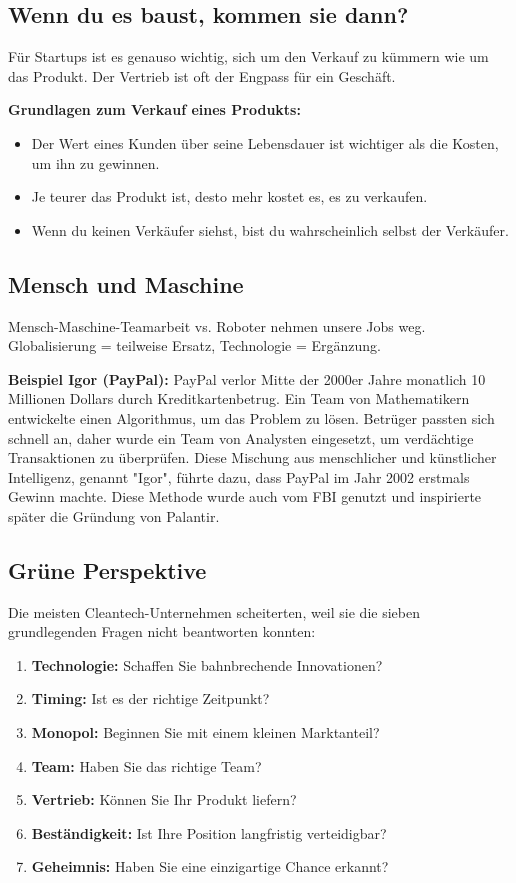 \documentclass[10pt]{article}
\begin{document}
\subsection{Wenn du es baust, kommen sie dann?}

Für Startups ist es genauso wichtig, sich um den Verkauf zu kümmern wie um das Produkt. Der Vertrieb ist oft der Engpass für ein Geschäft.

\textbf{Grundlagen zum Verkauf eines Produkts:}

\begin{itemize}
\item Der Wert eines Kunden über seine Lebensdauer ist wichtiger als die Kosten, um ihn zu gewinnen.
\item Je teurer das Produkt ist, desto mehr kostet es, es zu verkaufen.
\item Wenn du keinen Verkäufer siehst, bist du wahrscheinlich selbst der Verkäufer.
\end{itemize}

\subsection{Mensch und Maschine}

Mensch-Maschine-Teamarbeit vs. Roboter nehmen unsere Jobs weg.
Globalisierung = teilweise Ersatz, Technologie = Ergänzung.

\textbf{Beispiel Igor (PayPal):}
PayPal verlor Mitte der 2000er Jahre monatlich 10 Millionen Dollars durch Kreditkartenbetrug.
Ein Team von Mathematikern entwickelte einen Algorithmus, um das Problem zu lösen.
Betrüger passten sich schnell an, daher wurde ein Team von Analysten eingesetzt, um verdächtige Transaktionen zu überprüfen.
Diese Mischung aus menschlicher und künstlicher Intelligenz, genannt "Igor", führte dazu, dass PayPal im Jahr 2002 erstmals Gewinn machte.
Diese Methode wurde auch vom FBI genutzt und inspirierte später die Gründung von Palantir.

\subsection{Grüne Perspektive}

Die meisten Cleantech-Unternehmen scheiterten, weil sie die sieben grundlegenden Fragen nicht beantworten konnten:

\begin{enumerate}
\item \textbf{Technologie:} Schaffen Sie bahnbrechende Innovationen?
\item \textbf{Timing:} Ist es der richtige Zeitpunkt?
\item \textbf{Monopol:} Beginnen Sie mit einem kleinen Marktanteil?
\item \textbf{Team:} Haben Sie das richtige Team?
\item \textbf{Vertrieb:} Können Sie Ihr Produkt liefern?
\item \textbf{Beständigkeit:} Ist Ihre Position langfristig verteidigbar?
\item \textbf{Geheimnis:} Haben Sie eine einzigartige Chance erkannt?
\end{enumerate}
\end{document}
